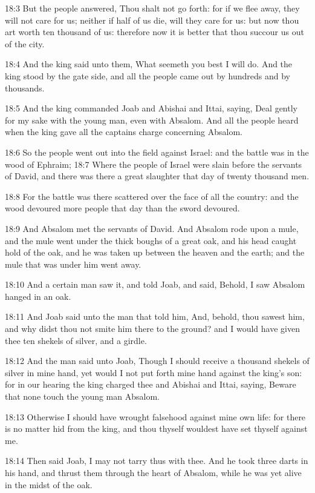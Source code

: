 18:3 But the people answered, Thou shalt not go forth: for if we flee
away, they will not care for us; neither if half of us die, will they
care for us: but now thou art worth ten thousand of us: therefore now
it is better that thou succour us out of the city.

18:4 And the king said unto them, What seemeth you best I will do. And
the king stood by the gate side, and all the people came out by
hundreds and by thousands.

18:5 And the king commanded Joab and Abishai and Ittai, saying, Deal
gently for my sake with the young man, even with Absalom. And all the
people heard when the king gave all the captains charge concerning
Absalom.

18:6 So the people went out into the field against Israel: and the
battle was in the wood of Ephraim; 18:7 Where the people of Israel
were slain before the servants of David, and there was there a great
slaughter that day of twenty thousand men.

18:8 For the battle was there scattered over the face of all the
country: and the wood devoured more people that day than the sword
devoured.

18:9 And Absalom met the servants of David. And Absalom rode upon a
mule, and the mule went under the thick boughs of a great oak, and his
head caught hold of the oak, and he was taken up between the heaven
and the earth; and the mule that was under him went away.

18:10 And a certain man saw it, and told Joab, and said, Behold, I saw
Absalom hanged in an oak.

18:11 And Joab said unto the man that told him, And, behold, thou
sawest him, and why didst thou not smite him there to the ground? and
I would have given thee ten shekels of silver, and a girdle.

18:12 And the man said unto Joab, Though I should receive a thousand
shekels of silver in mine hand, yet would I not put forth mine hand
against the king's son: for in our hearing the king charged thee and
Abishai and Ittai, saying, Beware that none touch the young man
Absalom.

18:13 Otherwise I should have wrought falsehood against mine own life:
for there is no matter hid from the king, and thou thyself wouldest
have set thyself against me.

18:14 Then said Joab, I may not tarry thus with thee. And he took
three darts in his hand, and thrust them through the heart of Absalom,
while he was yet alive in the midst of the oak.


